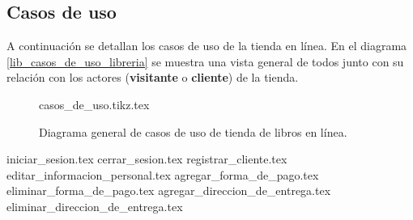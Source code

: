 %
%

\subsection{Casos de uso}

A continuación se detallan los casos de uso de la tienda en línea. En el
diagrama \ref{lib_casos_de_uso_libreria} se muestra una vista
general de todos junto con su relación con los actores (\textbf{visitante} o
\textbf{cliente}) de la tienda.

\begin{figure}
  \begin{center}
    {casos_de_uso.tikz.tex}
    \caption{Diagrama general de casos de uso de tienda de libros en línea.}
    \label{lib_casos_de_uso_general}
  \end{center}
\end{figure}

{iniciar_sesion.tex}
{cerrar_sesion.tex}
{registrar_cliente.tex}
{editar_informacion_personal.tex}
{agregar_forma_de_pago.tex}
{eliminar_forma_de_pago.tex}
{agregar_direccion_de_entrega.tex}
{eliminar_direccion_de_entrega.tex}
